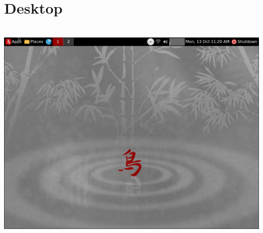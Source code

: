 \documentclass[12pt,a4paper]{book}
\begin{document}
\newpage 

 
\chapter{Desktop}

\\


\includegraphics[width=0.8\linewidth]{screen-shots/Torios_Alpha2-desktop}
\end{document}
